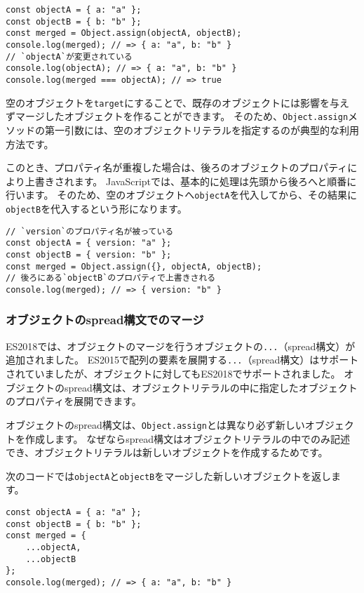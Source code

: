 \begin{lstlisting}
const objectA = { a: "a" };
const objectB = { b: "b" };
const merged = Object.assign(objectA, objectB);
console.log(merged); // => { a: "a", b: "b" }
// `objectA`が変更されている
console.log(objectA); // => { a: "a", b: "b" }
console.log(merged === objectA); // => true
\end{lstlisting}

空のオブジェクトを\texttt{target}にすることで、既存のオブジェクトには影響を与えずマージしたオブジェクトを作ることができます。
そのため、\texttt{Object.assign}メソッドの第一引数には、空のオブジェクトリテラルを指定するのが典型的な利用方法です。

このとき、プロパティ名が重複した場合は、後ろのオブジェクトのプロパティにより上書きされます。
JavaScriptでは、基本的に処理は先頭から後ろへと順番に行います。
そのため、空のオブジェクトへ\texttt{objectA}を代入してから、その結果に\texttt{objectB}を代入するという形になります。

\begin{lstlisting}
// `version`のプロパティ名が被っている
const objectA = { version: "a" };
const objectB = { version: "b" };
const merged = Object.assign({}, objectA, objectB);
// 後ろにある`objectB`のプロパティで上書きされる
console.log(merged); // => { version: "b" }
\end{lstlisting}

\hypertarget{object-spread-syntax}{%
\subsubsection{オブジェクトのspread構文でのマージ}\label{object-spread-syntax}}

ES2018では、オブジェクトのマージを行うオブジェクトの\texttt{...}（spread構文）が追加されました。
ES2015で配列の要素を展開する\texttt{...}（spread構文）はサポートされていましたが、オブジェクトに対してもES2018でサポートされました。
オブジェクトのspread構文は、オブジェクトリテラルの中に指定したオブジェクトのプロパティを展開できます。

オブジェクトのspread構文は、\texttt{Object.assign}とは異なり必ず新しいオブジェクトを作成します。
なぜならspread構文はオブジェクトリテラルの中でのみ記述でき、オブジェクトリテラルは新しいオブジェクトを作成するためです。

次のコードでは\texttt{objectA}と\texttt{objectB}をマージした新しいオブジェクトを返します。

\begin{lstlisting}
const objectA = { a: "a" };
const objectB = { b: "b" };
const merged = { 
    ...objectA,
    ...objectB
};
console.log(merged); // => { a: "a", b: "b" }
\end{lstlisting}


